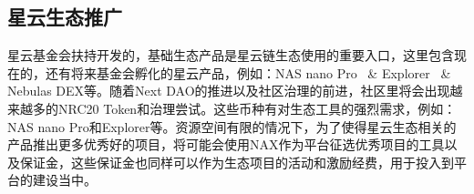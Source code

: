 \subsection{星云生态推广}
星云基金会扶持开发的，基础生态产品是星云链生态使用的重要入口，这里包含现在的，还有将来基金会孵化的星云产品，例如：NAS nano Pro~\cite{NASnano} \& Explorer~\cite{explorer} \& Nebulas DEX等。随着Next DAO的推进以及社区治理的前进，社区里将会出现越来越多的NRC20 Token和治理尝试。这些币种有对生态工具的强烈需求，例如：NAS nano Pro和Explorer等。资源空间有限的情况下，为了使得星云生态相关的产品推出更多优秀好的项目，将可能会使用NAX作为平台征选优秀项目的工具以及保证金，这些保证金也同样可以作为生态项目的活动和激励经费，用于投入到平台的建设当中。
